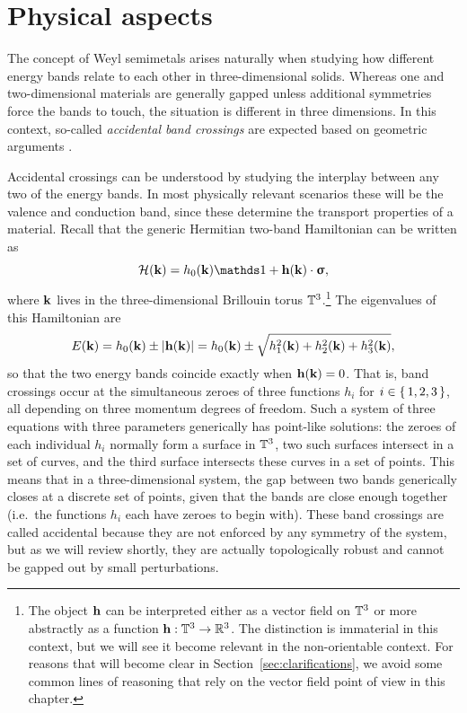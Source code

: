 \section{Physical aspects}\label{sec:semimetal-physics}

The concept of Weyl semimetals arises naturally when studying how different energy bands relate to each other in three-dimensional solids. Whereas one and two-dimensional materials are generally gapped unless additional symmetries force the bands to touch, the situation is different in three dimensions. In this context, so-called \emph{accidental band crossings} are expected based on geometric arguments \cite{Herring_Accidental}.

Accidental crossings can be understood by studying the interplay between any two of the energy bands. In most physically relevant scenarios these will be the valence and conduction band, since these determine the transport properties of a material. Recall that the generic Hermitian two-band Hamiltonian can be written as
\begin{equation*}
	\Hc(\k) = h_0(\k)\Id + \h(\k)\cdot\bm{\upsigma},
\end{equation*}
where $\vb{k}$ lives in the three-dimensional Brillouin torus $\mathbb{T}^3$.\footnote{
	The object $\vb{h}$ can be interpreted either as a vector field on $\mathbb{T}^3$ or more abstractly as a function $\vb{h}:\mathbb{T}^3\to\mathbb{R}^3$. The distinction is immaterial in this context, but we will see it become relevant in the non-orientable context. For reasons that will become clear in Section~\ref{sec:clarifications}, we avoid some common lines of reasoning that rely on the vector field point of view in this chapter.}
The eigenvalues of this Hamiltonian are
\begin{equation*}
	E(\vb{k}) = h_0(\vb{k}) \pm \abs{\vb{h}(\vb{k})} = h_0(\vb{k}) \pm \sqrt{h_1^2(\vb{k}) + h_2^2(\vb{k}) + h_3^2(\vb{k})},
\end{equation*}
so that the two energy bands coincide exactly when $\vb{h}(\vb{k}) = 0$. That is, band crossings occur at the simultaneous zeroes of three functions $h_i$ for $i\in\set{1,2,3}$, all depending on three momentum degrees of freedom. Such a system of three equations with three parameters generically has point-like solutions: the zeroes of each individual $h_i$ normally form a surface in $\mathbb{T}^3$, two such surfaces intersect in a set of curves, and the third surface intersects these curves in a set of points. This means that in a three-dimensional system, the gap between two bands generically closes at a discrete set of points, given that the bands are close enough together (i.e.\ the functions $h_i$ each have zeroes to begin with). These band crossings are called accidental because they are not enforced by any symmetry of the system, but as we will review shortly, they are actually topologically robust and cannot be gapped out by small perturbations.

